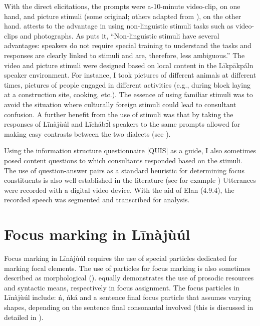 \documentclass[output=paper,colorlinks,citecolor=brown]{langscibook}
\begin{document}
With the direct elicitations, the prompts were a-10-minute video-clip, on one hand, and picture stimuli (some original; others adapted from \citealt{SkopeteasEtAl2006}), on the other hand. \citet[61]{Chelliah2013} attests to the advantage in using non-linguistic stimuli tasks such as video-clips and photographs. As \citet{Chelliah2013} puts it, “Non-linguistic stimuli have several advantages: speakers do not require special training to understand the tasks and responses are clearly linked to stimuli and are, therefore, less ambiguous.” The video and picture stimuli were designed based on local content in the Līkpākpáln speaker environment. For instance, I took pictures of different animals at different times, pictures of people engaged in different activities (e.g., during block laying at a construction site, cooking, etc.). The essence of using familiar stimuli was to avoid the situation where culturally foreign stimuli could lead to consultant confusion. A further benefit from the use of stimuli was that by taking the responses of Līnàjùúl and Līchábͻ́l speakers to the same prompts allowed for making easy contrasts between the two dialects (see \citealt[56]{Majid2012}).

Using the information structure questionnaire [QUIS] \citep{SkopeteasEtAl2006} as a guide, I also sometimes posed content questions to which consultants responded based on the stimuli. The use of question-answer pairs as a standard heuristic for determining focus constituents is also well established in the literature (see for example \citealt{Dik1978, Krifka2007, Watters1979}) Utterances were recorded with a digital video device. With the aid of Elan (4.9.4), the recorded speech was segmented and transcribed for analysis.

\section{Focus marking in Līnàjùúl }\label{sec:bisilki:5}

Focus marking in Līnàjùúl requires the use of special particles dedicated for marking focal elements. The use of particles for focus marking is also sometimes described as morphological (\citealt{Childs1997, HartmannZimmermann2009, Schwarz2009, VanPutten2016}). \citet{Rochemont1986} equally demonstrates the use of prosodic resources and syntactic means, respectively in focus assignment. The focus particles in Līnàjùúl include: ń, ńká and a sentence final focus particle that assumes varying shapes, depending on the sentence final consonantal involved (this is discussed in detailed in ).
\end{document}
